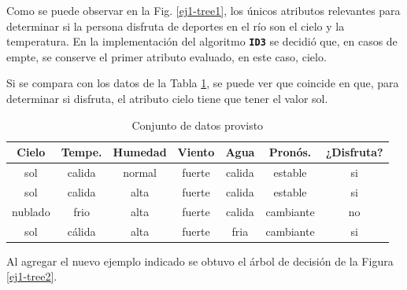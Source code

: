\documentclass[a4paper]{article}
\newcommand{\bold}[1]{\textbf{\texttt{#1}}}
\begin{document}
Como se puede observar en la Fig. \ref{ej1-tree1}, los únicos atributos relevantes para determinar si la persona disfruta de deportes en el río son el cielo y la temperatura. En la implementación del algoritmo \bold{ID3} se decidió que, en casos de empte, se conserve el primer atributo evaluado, en este caso, cielo.

Si se compara con los datos de la Tabla \ref{tab:dataset-1}, se puede ver que coincide en que, para determinar si disfruta, el atributo cielo tiene que tener el valor sol.

\begin{table}[h]
  \centering
  \begin{tabular}{ccccccc}
  Cielo                          & Tempe. & Humedad & Viento & Agua   & Pronós.    & ¿Disfruta?                \\ \hline
  {\color[HTML]{009901} sol}     & calida & normal  & fuerte & calida & estable   & {\color[HTML]{009901} si} \\
  {\color[HTML]{009901} sol}     & calida & alta    & fuerte & calida & estable   & {\color[HTML]{009901} si} \\
  {\color[HTML]{CB0000} nublado} & frio   & alta    & fuerte & calida & cambiante & {\color[HTML]{CB0000} no} \\
  {\color[HTML]{009901} sol}     & cálida & alta    & fuerte & fria   & cambiante & {\color[HTML]{009901} si}
  \end{tabular}
  \caption{Conjunto de datos provisto}
  \label{tab:dataset-1}
  \end{table}

Al agregar el nuevo ejemplo indicado se obtuvo el árbol de decisión de la Figura \ref{ej1-tree2}.
\end{document}
